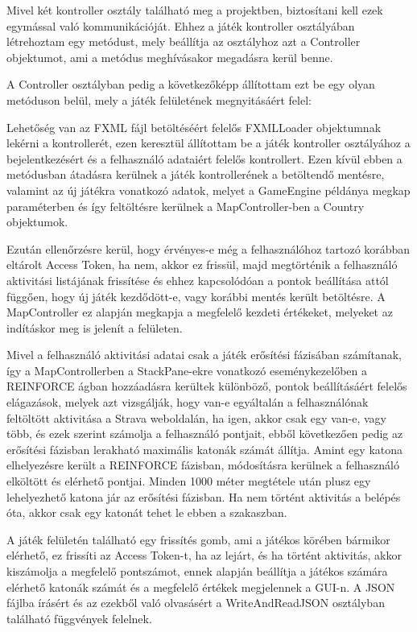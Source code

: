 Mivel két kontroller osztály található meg a projektben, biztosítani kell ezek egymással való kommunikációját. Ehhez a játék kontroller osztályában létrehoztam egy metódust, mely beállítja az osztályhoz azt a Controller objektumot, ami a metódus meghívásakor megadásra kerül benne. 

A Controller osztályban pedig a következőképp állítottam ezt be egy olyan metóduson belül, mely a játék felületének megnyitásáért felel: 


Lehetőség van az FXML fájl betöltéséért felelős FXMLLoader objektumnak lekérni a kontrollerét, ezen keresztül állítottam be a játék kontroller osztályához a bejelentkezésért és a felhasználó adataiért felelős kontrollert. Ezen kívül ebben a metódusban átadásra kerülnek a játék kontrollerének a betöltendő mentésre, valamint az új játékra vonatkozó adatok, melyet a GameEngine példánya megkap paraméterben és így feltöltésre kerülnek a MapController-ben a Country objektumok. 

Ezután ellenőrzésre kerül, hogy érvényes-e még a felhasználóhoz tartozó korábban eltárolt Access Token, ha nem, akkor ez frissül, majd megtörténik a felhasználó aktivitási listájának frissítése és ehhez kapcsolódóan a pontok beállítása attól függően, hogy új játék kezdődött-e, vagy korábbi mentés került betöltésre. A MapController ez alapján megkapja a megfelelő kezdeti értékeket, melyeket az indításkor meg is jelenít a felületen. 

Mivel a felhasználó aktivitási adatai csak a játék erősítési fázisában számítanak, így a MapControllerben a StackPane-ekre vonatkozó eseménykezelőben a REINFORCE ágban hozzáadásra kerültek különböző, pontok beállításáért felelős elágazások, melyek azt vizsgálják, hogy van-e egyáltalán a felhasználónak feltöltött aktivitása a Strava weboldalán, ha igen, akkor csak egy van-e, vagy több, és ezek szerint számolja a felhasználó pontjait, ebből következően pedig az erősítési fázisban lerakható maximális katonák számát állítja. Amint egy katona elhelyezésre került a REINFORCE fázisban, módosításra kerülnek a felhasználó elköltött és elérhető pontjai. Minden 1000 méter megtétele után plusz egy lehelyezhető katona jár az erősítési fázisban. Ha nem történt aktivitás a belépés óta, akkor csak egy katonát tehet le ebben a szakaszban. 

A játék felületén található egy frissítés gomb, ami a játékos körében bármikor elérhető, ez frissíti az Access Token-t, ha az lejárt, és ha történt aktivitás, akkor kiszámolja a megfelelő pontszámot, ennek alapján beállítja a játékos számára elérhető katonák számát és a megfelelő értékek megjelennek a GUI-n. A JSON fájlba írásért és az ezekből való olvasásért a WriteAndReadJSON osztályban található függvények felelnek. 

